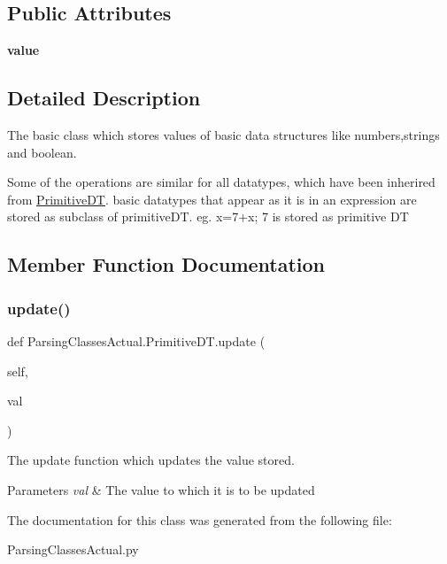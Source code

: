 \subsection*{Public Attributes}
\begin{DoxyCompactItemize}
\item 
\mbox{\label{class_parsing_classes_actual_1_1_primitive_d_t_a5068a462424619a605aaa95ad6e133ea}} 
{\bfseries value}
\end{DoxyCompactItemize}


\subsection{Detailed Description}
The basic class which stores values of basic data structures like numbers,strings and boolean. 

Some of the operations are similar for all datatypes, which have been inherired from \hyperlink{class_parsing_classes_actual_1_1_primitive_d_t}{Primitive\+DT}. basic datatypes that appear as it is in an expression are stored as subclass of primitive\+DT. eg. x=7+x; 7 is stored as primitive DT 

\subsection{Member Function Documentation}
\mbox{\label{class_parsing_classes_actual_1_1_primitive_d_t_ac6dd10edd29b85354b53ad165f5704d1}} 
\subsubsection{\texorpdfstring{update()}{update()}}
{\footnotesize\ttfamily def Parsing\+Classes\+Actual.\+Primitive\+D\+T.\+update (\begin{DoxyParamCaption}\item[{}]{self,  }\item[{}]{val }\end{DoxyParamCaption})}



The update function which updates the value stored. 


\begin{DoxyParams}{Parameters}
{\em val} & The value to which it is to be updated \\
\hline
\end{DoxyParams}


The documentation for this class was generated from the following file\+:\begin{DoxyCompactItemize}
\item 
Parsing\+Classes\+Actual.\+py\end{DoxyCompactItemize}
